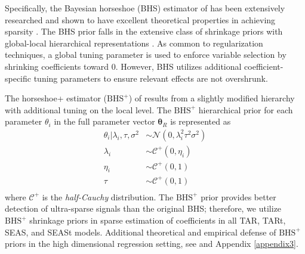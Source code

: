 Specifically, the Bayesian horseshoe (BHS) estimator of \citep{Carvalho2009,Carvalho2010} has been extensively researched and shown to have excellent theoretical properties in achieving sparsity \citep{Polson2012,Datta2013,vanderPas2014}. The BHS prior falls in the extensive class of shrinkage priors with global-local hierarchical representations \citep{Polson2010}. As common to regularization techniques, a global tuning parameter is used to enforce variable selection by shrinking coefficients toward 0. However, BHS utilizes additional coefficient-specific tuning parameters to ensure relevant effects are not overshrunk. 

The horseshoe+ estimator ($\textrm{BHS}^+$) of \cite{Bhadra2016} results from a slightly modified hierarchy with additional tuning on the local level. The $\textrm{BHS}^+$ hierarchical prior for each parameter $\theta_i$ in the full parameter vector $\bm{\theta}_R$ is represented as
\begin{equation}
\label{eq:traffichsp}
\begin{split}
	\theta_i|\lambda_i,\tau,\sigma^2 & \sim \mathcal{N}(0,\lambda^2_i\tau^2\sigma^2) \\
	\lambda_i &\sim \mathcal{C}^+(0,\eta_i)\\
	\eta_i & \sim \mathcal{C}^+(0,1)\\
	\tau &\sim \mathcal{C}^+(0,1)\\
\end{split}
\end{equation}
where $\mathcal{C}^+$ is the \textit{half-Cauchy} distribution. The $\textrm{BHS}^+$ prior provides better detection of ultra-sparse signals than the original BHS; therefore, we utilize $\textrm{BHS}^+$ shrinkage priors in sparse estimation of coefficients in all TAR, TARt, SEAS, and SEASt models.  Additional theoretical and empirical defense of $\textrm{BHS}^+$ priors in the high dimensional regression setting, see \cite{Bhadra2016} and Appendix \ref{appendix3}.

